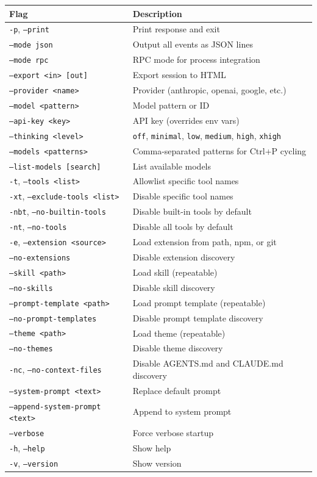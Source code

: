 \documentclass[12pt]{article}
\begin{document}
\begin{tabular}{@{}ll@{}}
\toprule
\textbf{Flag} & \textbf{Description} \\
\midrule
\texttt{-p}, \texttt{--print} & Print response and exit \\
\texttt{--mode json} & Output all events as JSON lines \\
\texttt{--mode rpc} & RPC mode for process integration \\
\texttt{--export <in> [out]} & Export session to HTML \\
\texttt{--provider <name>} & Provider (anthropic, openai, google, etc.) \\
\texttt{--model <pattern>} & Model pattern or ID \\
\texttt{--api-key <key>} & API key (overrides env vars) \\
\texttt{--thinking <level>} & \texttt{off}, \texttt{minimal}, \texttt{low}, \texttt{medium}, \texttt{high}, \texttt{xhigh} \\
\texttt{--models <patterns>} & Comma-separated patterns for Ctrl+P cycling \\
\texttt{--list-models [search]} & List available models \\
\texttt{-t}, \texttt{--tools <list>} & Allowlist specific tool names \\
\texttt{-xt}, \texttt{--exclude-tools <list>} & Disable specific tool names \\
\texttt{-nbt}, \texttt{--no-builtin-tools} & Disable built-in tools by default \\
\texttt{-nt}, \texttt{--no-tools} & Disable all tools by default \\
\texttt{-e}, \texttt{--extension <source>} & Load extension from path, npm, or git \\
\texttt{--no-extensions} & Disable extension discovery \\
\texttt{--skill <path>} & Load skill (repeatable) \\
\texttt{--no-skills} & Disable skill discovery \\
\texttt{--prompt-template <path>} & Load prompt template (repeatable) \\
\texttt{--no-prompt-templates} & Disable prompt template discovery \\
\texttt{--theme <path>} & Load theme (repeatable) \\
\texttt{--no-themes} & Disable theme discovery \\
\texttt{-nc}, \texttt{--no-context-files} & Disable AGENTS.md and CLAUDE.md discovery \\
\texttt{--system-prompt <text>} & Replace default prompt \\
\texttt{--append-system-prompt <text>} & Append to system prompt \\
\texttt{--verbose} & Force verbose startup \\
\texttt{-h}, \texttt{--help} & Show help \\
\texttt{-v}, \texttt{--version} & Show version \\
\bottomrule
\end{tabular}
\end{document}
